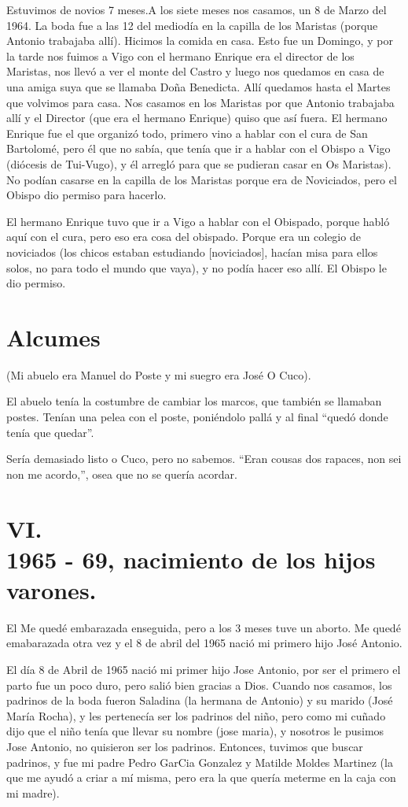 \documentclass[12pt,a5paper]{book}
\begin{document}
Estuvimos de novios 7 meses.A los siete meses nos casamos, un 8 de Marzo del 1964. La boda fue a las 12 del mediodía en la capilla de los Maristas (porque Antonio trabajaba allí). Hicimos la comida en casa. Esto fue un Domingo, y por la tarde nos fuimos a Vigo con el hermano Enrique era el director de los Maristas, nos llevó a ver el monte del Castro y luego nos quedamos en casa de una amiga suya que se llamaba Doña Benedicta. Allí quedamos hasta el Martes que volvimos para casa. Nos casamos en los Maristas por que Antonio trabajaba allí y el Director (que era el hermano Enrique) quiso que así fuera. El hermano Enrique fue el que organizó todo, primero vino a hablar con el cura de San Bartolomé, pero él que no sabía, que tenía que ir a hablar con el Obispo a Vigo (diócesis de Tui-Vugo), y él arregló para que se pudieran casar en Os Maristas). No podían casarse en la capilla de los Maristas porque era de Noviciados, pero el Obispo dio permiso para hacerlo.

El hermano Enrique tuvo que ir a Vigo a hablar con el Obispado, porque habló aquí con el cura, pero eso era cosa del obispado. Porque era un colegio de noviciados (los chicos estaban estudiando [noviciados], hacían misa para ellos solos, no para todo el mundo que vaya), y no podía hacer eso allí. El Obispo le dio permiso.


\section*{Alcumes}

(Mi abuelo era Manuel do Poste y mi suegro era José O Cuco).

El abuelo tenía la costumbre de cambiar los marcos, que también se llamaban postes. Tenían una pelea con el poste, poniéndolo pallá y al final “quedó donde tenía que quedar”.

Sería demasiado listo o Cuco, pero no sabemos. “Eran cousas dos rapaces, non sei non me acordo,”, osea que no se quería acordar.


\section*{VI.\\1965 - 69, nacimiento de los hijos varones.}

El Me quedé embarazada enseguida, pero a los 3 meses tuve un aborto. Me quedé emabarazada otra vez y el 8 de abril del 1965 nació mi primero hijo José Antonio.

El día 8 de Abril de 1965 nació mi primer hijo Jose Antonio, por ser el primero el parto fue un poco duro, pero salió bien gracias a Dios. Cuando nos casamos, los padrinos de la boda fueron Saladina (la hermana de Antonio) y su marido (José María Rocha), y les pertenecía ser los padrinos del niño, pero como mi cuñado dijo que el niño tenía que llevar su nombre (jose maria), y nosotros le pusimos Jose Antonio, no quisieron ser los padrinos. Entonces, tuvimos que buscar padrinos, y fue mi padre Pedro GarCia Gonzalez y Matilde Moldes Martinez (la que me ayudó a criar a mí misma, pero era la que quería meterme en la caja con mi madre). 
\end{document}
